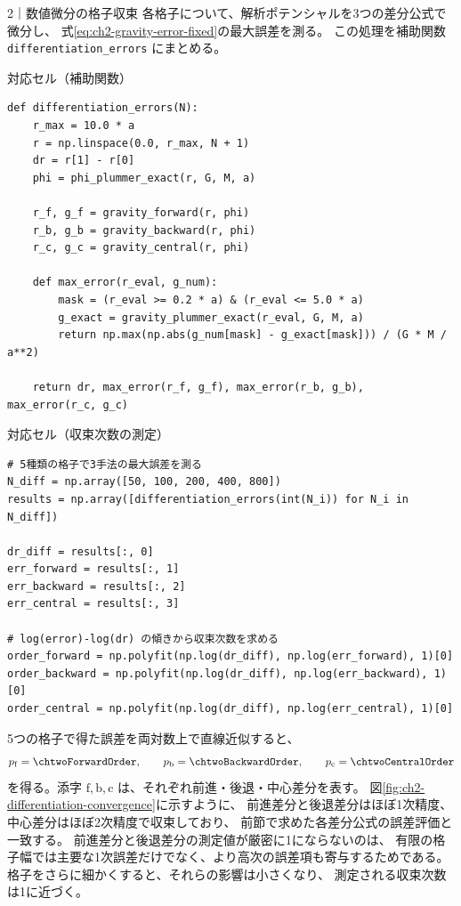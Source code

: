 \begin{notebookblock}{2｜数値微分の格子収束}
各格子について、解析ポテンシャルを3つの差分公式で微分し、
式\eqref{eq:ch2-gravity-error-fixed}の最大誤差を測る。
この処理を補助関数 \texttt{differentiation\_errors} にまとめる。

{\sffamily\small\color{graytext}対応セル（補助関数）}
\begin{Verbatim}[xleftmargin=2mm,fontsize=\small,frame=single,framesep=1.8mm,framerule=0.35pt,rulecolor=\color{listingframe},fillcolor=\color{listingbg}]
def differentiation_errors(N):
    r_max = 10.0 * a
    r = np.linspace(0.0, r_max, N + 1)
    dr = r[1] - r[0]
    phi = phi_plummer_exact(r, G, M, a)

    r_f, g_f = gravity_forward(r, phi)
    r_b, g_b = gravity_backward(r, phi)
    r_c, g_c = gravity_central(r, phi)

    def max_error(r_eval, g_num):
        mask = (r_eval >= 0.2 * a) & (r_eval <= 5.0 * a)
        g_exact = gravity_plummer_exact(r_eval, G, M, a)
        return np.max(np.abs(g_num[mask] - g_exact[mask])) / (G * M / a**2)

    return dr, max_error(r_f, g_f), max_error(r_b, g_b), max_error(r_c, g_c)
\end{Verbatim}

{\sffamily\small\color{graytext}対応セル（収束次数の測定）}
\begin{Verbatim}[xleftmargin=2mm,fontsize=\small,frame=single,framesep=1.8mm,framerule=0.35pt,rulecolor=\color{listingframe},fillcolor=\color{listingbg}]
# 5種類の格子で3手法の最大誤差を測る
N_diff = np.array([50, 100, 200, 400, 800])
results = np.array([differentiation_errors(int(N_i)) for N_i in N_diff])

dr_diff = results[:, 0]
err_forward = results[:, 1]
err_backward = results[:, 2]
err_central = results[:, 3]

# log(error)-log(dr) の傾きから収束次数を求める
order_forward = np.polyfit(np.log(dr_diff), np.log(err_forward), 1)[0]
order_backward = np.polyfit(np.log(dr_diff), np.log(err_backward), 1)[0]
order_central = np.polyfit(np.log(dr_diff), np.log(err_central), 1)[0]
\end{Verbatim}
\end{notebookblock}

5つの格子で得た誤差を両対数上で直線近似すると、
\begin{equation}
 p_{\rm f}=\chtwoForwardOrder,
 \qquad
 p_{\rm b}=\chtwoBackwardOrder,
 \qquad
 p_{\rm c}=\chtwoCentralOrder
\label{eq:ch2-diff-orders}
\end{equation}
を得る。添字 $\mathrm f,\mathrm b,\mathrm c$ は、それぞれ前進・後退・中心差分を表す。
図\ref{fig:ch2-differentiation-convergence}に示すように、
前進差分と後退差分はほぼ1次精度、中心差分はほぼ2次精度で収束しており、
前節で求めた各差分公式の誤差評価と一致する。
前進差分と後退差分の測定値が厳密に1にならないのは、
有限の格子幅では主要な1次誤差だけでなく、より高次の誤差項も寄与するためである。
格子をさらに細かくすると、それらの影響は小さくなり、
測定される収束次数は1に近づく。


